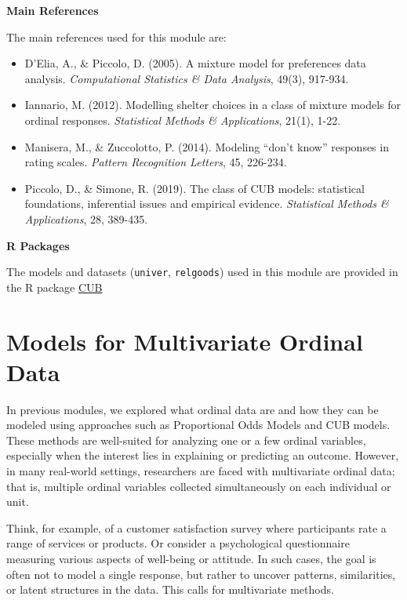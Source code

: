 \documentclass[
  letterpaper,
  DIV=11,
  numbers=noendperiod]{scrartcl}
\begin{document}
\textbf{Main References}

The main references used for this module are:

\begin{itemize}
\item
  D'Elia, A., \& Piccolo, D. (2005). A mixture model for preferences
  data analysis. \emph{Computational Statistics \& Data Analysis},
  49(3), 917-934.
\item
  Iannario, M. (2012). Modelling shelter choices in a class of mixture
  models for ordinal responses. \emph{Statistical Methods \&
  Applications}, 21(1), 1-22.
\item
  Manisera, M., \& Zuccolotto, P. (2014). Modeling ``don't know''
  responses in rating scales. \emph{Pattern Recognition Letters}, 45,
  226-234.
\item
  Piccolo, D., \& Simone, R. (2019). The class of CUB models:
  statistical foundations, inferential issues and empirical evidence.
  \emph{Statistical Methods \& Applications}, 28, 389-435.
\end{itemize}

\textbf{R Packages}

The models and datasets (\texttt{univer}, \texttt{relgoods}) used in
this module are provided in the R package
\href{https://rdrr.io/cran/CUB/}{CUB}

\hypertarget{models-for-multivariate-ordinal-data}{%
\section{Models for Multivariate Ordinal
Data}\label{models-for-multivariate-ordinal-data}}

In previous modules, we explored what ordinal data are and how they can
be modeled using approaches such as Proportional Odds Models and CUB
models. These methods are well-suited for analyzing one or a few ordinal
variables, especially when the interest lies in explaining or predicting
an outcome. However, in many real-world settings, researchers are faced
with multivariate ordinal data; that is, multiple ordinal variables
collected simultaneously on each individual or unit.

Think, for example, of a customer satisfaction survey where participants
rate a range of services or products. Or consider a psychological
questionnaire measuring various aspects of well-being or attitude. In
such cases, the goal is often not to model a single response, but rather
to uncover patterns, similarities, or latent structures in the data.
This calls for multivariate methods.
\end{document}
